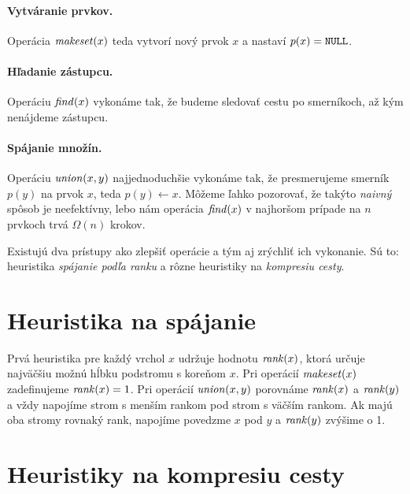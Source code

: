 \paragraph{Vytváranie prvkov.}%
Operácia $\mathop{\mathit{makeset}}(x)$ teda vytvorí nový prvok $x$ a nastaví $p(x) = \texttt{NULL}$. 

\paragraph{Hľadanie zástupcu.}%
Operáciu $\mathop{\mathit{find}}(x)$ vykonáme tak, že budeme sledovať cestu po smerníkoch, až 
kým nenájdeme zástupcu. 

\paragraph{Spájanie množín.}%
Operáciu $\mathop{\mathit{union}}(x, y)$ najjednoduchšie vykonáme tak, že presmerujeme smerník 
$p(y)$ na prvok $x$, teda $p(y) \gets x$. 
Môžeme ľahko pozorovať, že takýto \emph{naivný} spôsob je neefektívny, 
lebo nám operácia $\mathop{\mathit{find}}(x)$ v najhoršom prípade na $n$ prvkoch trvá $\Omega(n)$ 
krokov. 

\bigskip
Existujú dva prístupy ako zlepšiť operácie a tým aj zrýchliť ich vykonanie. 
Sú to: heuristika \emph{spájanie podľa ranku} a rôzne heuristiky na 
\emph{kompresiu cesty}. 

\section{Heuristika na spájanie}\label{sec:komp-union}

Prvá heuristika pre každý vrchol $x$ udržuje hodnotu $\mathop{\mathit{rank}}(x)$,
ktorá určuje najväčšiu možnú hĺbku podstromu s koreňom $x$.
Pri o\-pe\-rá\-cií $\mathop{\mathit{makeset}}(x)$ zadefinujeme $\mathop{\mathit{rank}}(x) = 1$. 
Pri o\-pe\-rá\-cií $\mathop{\mathit{union}}(x, y)$ porovnáme $\mathop{\mathit{rank}}(x)$ a $\mathop{\mathit{rank}}(y)$
a vždy napojíme strom s menším rankom pod strom s väčším rankom.
Ak majú oba stromy rovnaký rank, napojíme povedzme $x$ pod $y$
a $\mathop{\mathit{rank}}(y)$ zvýšime o 1.

\section{Heuristiky na kompresiu cesty}\label{sec:komp-cesta}
      
